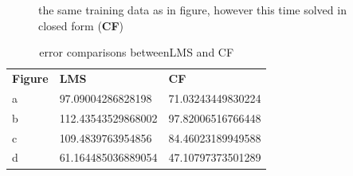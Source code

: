 \begin{figure}[!h]
\begin{center}
\centering
{}
\end{center}
\caption{\label{fig:cf}the same training data as in figure, however this time solved in closed form (\textbf{CF}) }
\end{figure}


\begin{table}[!h]
\begin{tabular}{lll}
\textbf{Figure} & \textbf{LMS} & \textbf{CF} \\
a               &       97.09004286828198       &     71.03243449830224       \\
b               &      112.43543529868002        &     97.82006516766448          \\
c               &        109.4839763954856      &        84.46023189949588         \\
d               &        61.164485036889054      &         47.10797373501289        \\
\end{tabular}
\caption{\label{tab:error} error comparisons between{LMS} and {CF}}
\end{table}

